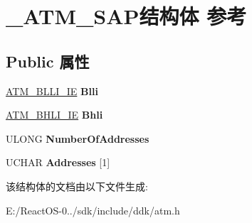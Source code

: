 \hypertarget{struct___a_t_m___s_a_p}{}\section{\+\_\+\+A\+T\+M\+\_\+\+S\+A\+P结构体 参考}
\label{struct___a_t_m___s_a_p}
\subsection*{Public 属性}
\begin{DoxyCompactItemize}
\item 
\mbox{\label{struct___a_t_m___s_a_p_a753592afb530496ae7233c8198cefb9c}} 
\hyperlink{struct_a_t_m___b_l_l_i___i_e}{A\+T\+M\+\_\+\+B\+L\+L\+I\+\_\+\+IE} {\bfseries Blli}
\item 
\mbox{\label{struct___a_t_m___s_a_p_aa52ad6b125b80fbca9c6e2d26bdfaf10}} 
\hyperlink{struct___a_t_m___b_h_l_i___i_e}{A\+T\+M\+\_\+\+B\+H\+L\+I\+\_\+\+IE} {\bfseries Bhli}
\item 
\mbox{\label{struct___a_t_m___s_a_p_a023830db470914a74eed026cd576fb6d}} 
U\+L\+O\+NG {\bfseries Number\+Of\+Addresses}
\item 
\mbox{\label{struct___a_t_m___s_a_p_ac39fb136829cec0a31edd50bfcb8d420}} 
U\+C\+H\+AR {\bfseries Addresses} \mbox{[}1\mbox{]}
\end{DoxyCompactItemize}


该结构体的文档由以下文件生成\+:\begin{DoxyCompactItemize}
\item 
E\+:/\+React\+O\+S-\/0../sdk/include/ddk/atm.\+h\end{DoxyCompactItemize}
